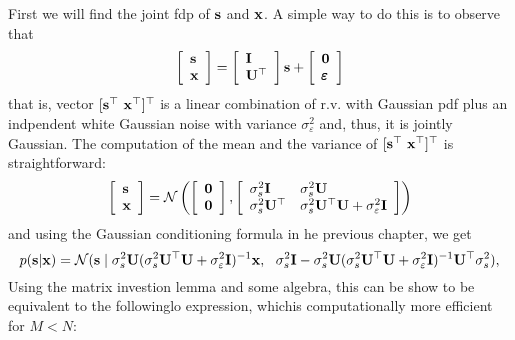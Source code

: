 First we will find the joint fdp of ${\mathbf s}$ and ${\mathbf x}$. A simple way to do this is to observe that
\begin{equation}
\left[\begin{array}{l} {\mathbf s} \\ {\mathbf x} \\ \end{array}\right] =
\left[\begin{array}{l} {\mathbf I} \\ {\mathbf U}^\top \\ \end{array}\right] {\mathbf s} + 
\left[\begin{array}{l} \bf 0 \\ \pmb{\varepsilon} \\ \end{array}\right]
\end{equation}
%
that is, vector $[{\mathbf s}^\top~{\mathbf x}^\top]^\top$ is a linear combination of r.v. with Gaussian pdf plus an indpendent white Gaussian noise with variance $\sigma_\varepsilon^2$ and, thus, it is jointly Gaussian. The computation of the mean and the variance of $[{\mathbf s}^\top~{\mathbf x}^\top]^\top$ is straightforward:
%
\begin{equation}
\left[\begin{array}{l} {\mathbf s} \\ {\mathbf x} \end{array}\right]
    = {\mathcal N}\left(
    	\left[\begin{array}{l}  \bf 0 \\ \bf 0 \end{array}\right],
        \left[\begin{array}{ll} \sigma_s^2{\mathbf I}     & \sigma_s^2{\mathbf U} \\
                                \sigma_s^2{\mathbf U}^\top & \sigma_s^2{\mathbf U}^\top{\mathbf U} + 
                                                     \sigma_\varepsilon^2 {\mathbf I}
              \end{array}\right] \right)
\label{eq:jointsx}
\end{equation}
and using the Gaussian conditioning formula in he previous chapter, we get
\begin{equation}
p({\mathbf s}|{\mathbf x}) 
	= {\mathcal N}({\mathbf s} \mid \sigma_s^2 {\mathbf U}(\sigma_s^2{\mathbf U}^\top{\mathbf U} + \sigma_\varepsilon^2{\mathbf I})^{-1} {\mathbf x},~~
\sigma_s^2{\mathbf I} - \sigma_s^2{\mathbf U}(\sigma_s^2{\mathbf U}^\top{\mathbf U} + \sigma_\varepsilon^2{\mathbf I})^{-1} {\mathbf U}^\top \sigma_s^2
) ,
\end{equation}
%
Using the matrix investion lemma and some algebra, this can be show to be equivalent to the followinglo expression, whichis computationally more efficient for $M<N$:
